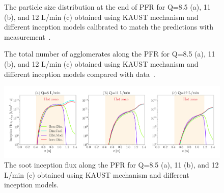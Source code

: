 \begin{figure}[H]
	\centering
	\caption{The particle size distribution at the end of PFR for Q=8.5 (a), 11 (b), and 12 L/min (c) obtained using KAUST mechanism and different inception models calibrated to match the predictions with measurement~\citep{mei2019quantitative}.}
	\label{fig:pfr_psd} 
\end{figure}

\begin{figure}[H]
	\centering
	\caption{The total number of agglomerates along the PFR for Q=8.5 (a), 11 (b), and 12 L/min (c) obtained using KAUST mechanism and different inception models compared with data~\citep{mei2019quantitative}.}
	\label{fig:pfr_Nagg} 
\end{figure}

\begin{figure}[H]
	\centering
	\includegraphics[width=1\textwidth]{Figures/Results/PFR/inception.pdf}
	\caption{The soot inception flux along the PFR for Q=8.5 (a), 11 (b), and 12 L/min (c) obtained using KAUST mechanism and different inception models.}
	\label{fig:pfr_Iinc} 
\end{figure}


